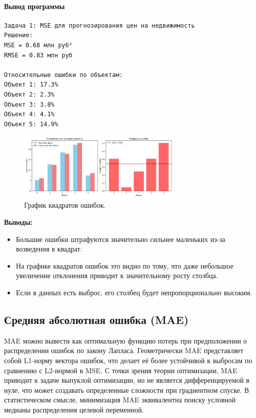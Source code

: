 \paragraph{Вывод программы}
\begin{verbatim}
Задача 1: MSE для прогнозирования цен на недвижимость
Решение:
MSE = 0.68 млн руб²
RMSE = 0.83 млн руб

Относительные ошибки по объектам:
Объект 1: 17.3%
Объект 2: 2.3%
Объект 3: 3.8%
Объект 4: 4.1%
Объект 5: 14.9%
\end{verbatim}
\begin{figure}[h!]
    \centering
    \includegraphics[width=0.7\textwidth]{chapters/general/imgs/mse.png}
    \caption{График квадратов ошибок.}
    \label{fig:mse_graph}
\end{figure}

\noindent\textbf{Выводы:}
\begin{itemize}
    \item Большие ошибки штрафуются значительно сильнее маленьких из-за возведения в квадрат.
    \item На графике квадратов ошибок это видно по тому, что даже небольшое увеличение отклонения приводит к значительному росту столбца.
    \item Если в данных есть выброс, его столбец будет непропорционально высоким.
\end{itemize}
\subsection{Средняя абсолютная ошибка (MAE)}

MAE можно вывести как оптимальную функцию потерь при предположении о распределении ошибок по закону Лапласа. Геометрически MAE представляет собой L1-норму вектора ошибок, что делает её более устойчивой к выбросам по сравнению с L2-нормой в MSE. С точки зрения теории оптимизации, MAE приводит к задаче выпуклой оптимизации, но не является дифференцируемой в нуле, что может создавать определенные сложности при градиентном спуске. В статистическом смысле, минимизация MAE эквивалентна поиску условной медианы распределения целевой переменной.

